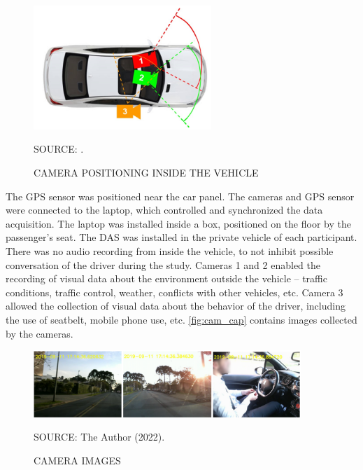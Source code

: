 \begin{figure}[!htbp]
    \centering\footnotesize
    \captionsetup{font=footnotesize}
    \caption{CAMERA POSITIONING INSIDE THE VEHICLE}
    \includegraphics[width=0.6\textwidth]{fig/cam_install.png}
    \label{fig:cam_install}
    \par SOURCE: \textcite{Amancio2021}.
\end{figure}

The GPS sensor was positioned near the car panel. The cameras and GPS sensor were connected to the laptop, which controlled and synchronized the data acquisition. The laptop was installed inside a box, positioned on the floor by the passenger's seat. The DAS was installed in the private vehicle of each participant. There was no audio recording from inside the vehicle, to not inhibit possible conversation of the driver during the study. Cameras 1 and 2 enabled the recording of visual data about the environment outside the vehicle – traffic conditions, traffic control, weather, conflicts with other vehicles, etc. Camera 3 allowed the collection of visual data about the behavior of the driver, including the use of seatbelt, mobile phone use, etc. \autoref{fig:cam_cap} contains images collected by the cameras.  

\begin{figure}[!htbp]
    \centering\footnotesize
    \captionsetup{font=footnotesize}
    \caption{CAMERA IMAGES}
    \includegraphics[width=0.9\textwidth]{fig/cam_cap.png}
    \label{fig:cam_cap}
    \par SOURCE: The Author (2022).
\end{figure}

